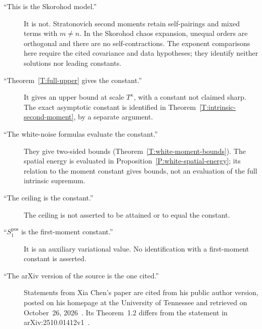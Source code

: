 \begin{description}
  \item[``This is the Skorohod model.''] It is not. Stratonovich second
    moments retain self-pairings and mixed terms with $m\ne n$. In the
    Skorohod chaos expansion, unequal orders are orthogonal and there are no
    self-contractions. The exponent comparisons here require the cited
    covariance and data hypotheses; they identify neither solutions nor
    leading constants.
  \item[``Theorem~\ref{T:full-upper} gives the constant.''] It gives an upper
    bound at scale $T^\kappa$, with a constant not claimed sharp. The exact
    asymptotic constant is identified in Theorem~\ref{T:intrinsic-second-moment},
    by a separate argument.
  \item[``The white-noise formulas evaluate the constant.''] They give
    two-sided bounds (Theorem~\ref{T:white-moment-bounds}). The spatial energy
    is evaluated in Proposition~\ref{P:white-spatial-energy}; its relation to
    the moment constant gives bounds, not an evaluation of the full intrinsic
    supremum.
  \item[``The ceiling is the constant.''] The ceiling is not asserted to be
    attained or to equal the constant.
  \item[``$S_1^{\mathrm{pos}}$ is the first-moment constant.''] It is an
    auxiliary variational value. No identification with a first-moment
    constant is asserted.
  \item[``The arXiv version of the source is the one cited.''] Statements from
    Xia Chen's paper are cited from his public author version, posted on his
    homepage at the University of Tennessee and retrieved on October~26,
    2026~\cite{chen:author2026:time-dependency}. Its Theorem~1.2 differs from
    the statement in arXiv:2510.01412v1~\cite{chen:25:time-dependency}.
\end{description}

